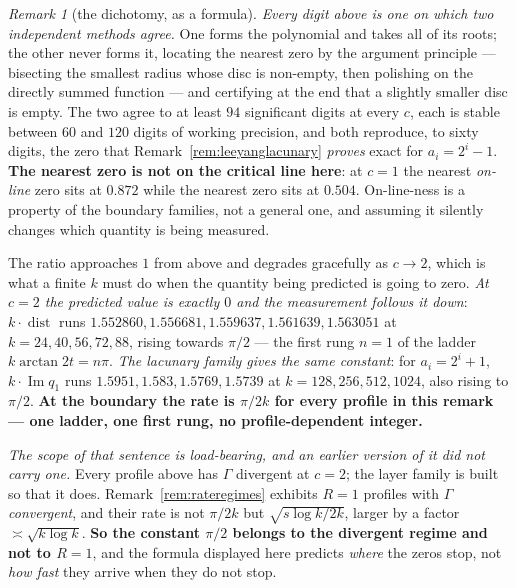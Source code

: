 \documentclass[11pt,a4paper]{article}
\theoremstyle{plain}
\theoremstyle{definition}
\theoremstyle{remark}
\newtheorem{remark}[theorem]{Remark}
\begin{document}
\begin{remark}[the dichotomy, as a formula]
\emph{Every digit above is one on which two independent methods agree.} One forms the polynomial
and takes all of its roots; the other never forms it, locating the nearest zero by the argument
principle --- bisecting the smallest radius whose disc is non-empty, then polishing on the
directly summed function --- and certifying at the end that a slightly smaller disc is empty. The
two agree to at least $94$ significant digits at every $c$, each is stable between $60$ and $120$
digits of working precision, and both reproduce, to sixty digits, the zero that
Remark~\ref{rem:leeyanglacunary} \emph{proves} exact for $a_i=2^{i}-1$. \textbf{The nearest zero
is not on the critical line here}: at $c=1$ the nearest \emph{on-line} zero sits at $0.872$ while
the nearest zero sits at $0.504$. On-line-ness is a property of the boundary families, not a
general one, and assuming it silently changes which quantity is being measured.

The ratio approaches $1$ from above and degrades gracefully as $c\to2$, which is what a finite
$k$ must do when the quantity being predicted is going to zero. \emph{At $c=2$ the predicted
value is exactly $0$ and the measurement follows it down}: $k\cdot\operatorname{dist}$ runs
$1.552860,1.556681,1.559637,1.561639,1.563051$ at $k=24,40,56,72,88$, rising towards $\pi/2$ ---
the first rung $n=1$ of the ladder $k\arctan2t=n\pi$. \emph{The lacunary family gives the same
constant}: for $a_i=2^{i}+1$, $k\cdot\operatorname{Im}q_1$ runs $1.5951, 1.583, 1.5769, 1.5739$ at
$k=128,256,512,1024$, also rising to $\pi/2$. \textbf{At the boundary the rate is $\pi/2k$ for
every profile in this remark --- one ladder, one first rung, no profile-dependent integer.}

\emph{The scope of that sentence is load-bearing, and an earlier version of it did not carry
one.} Every profile above has $\Gamma$ divergent at $c=2$; the layer family is built so that it
does. Remark~\ref{rem:rateregimes} exhibits $R=1$ profiles with $\Gamma$ \emph{convergent}, and
their rate is not $\pi/2k$ but $\sqrt{s\log k/2k}$, larger by a factor $\asymp\sqrt{k\log k}$.
\textbf{So the constant $\pi/2$ belongs to the divergent regime and not to $R=1$}, and the
formula displayed here predicts \emph{where} the zeros stop, not \emph{how fast} they arrive
when they do not stop.


\end{remark}
\end{document}
